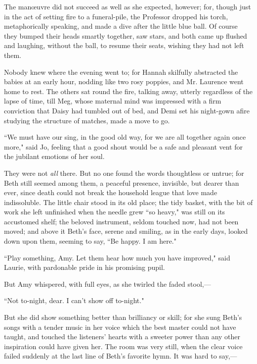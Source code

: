 The manœuvre did not succeed as well as she expected, however; for,
though just in the act of setting fire to a funeral-pile, the Professor
dropped his torch, metaphorically speaking, and made a dive after the
little blue ball. Of course they bumped their heads smartly together,
saw stars, and both came up flushed and laughing, without the ball, to
resume their seats, wishing they had not left them.

Nobody knew where the evening went to; for Hannah skilfully abstracted
the babies at an early hour, nodding like two rosy poppies, and Mr.
Laurence went home to rest. The others sat round the fire, talking away,
utterly regardless of the lapse of time, till Meg, whose maternal mind
was impressed with a firm conviction that Daisy had tumbled out of bed,
and Demi set his night-gown afire studying the structure of matches,
made a move to go.

``We must have our sing, in the good old way, for we are all together
again once more," said Jo, feeling that a good shout would be a safe and
pleasant vent for the jubilant emotions of her soul.

They were not \emph{all} there. But no one found the words thoughtless
or untrue; for Beth still seemed among them, a peaceful presence,
invisible, but dearer than ever, since death could not break the
household league that love made indissoluble. The little chair stood in
its old place; the tidy basket, with the bit of work she left unfinished
when the needle grew ``so heavy," was still on its accustomed shelf; the
beloved instrument, seldom touched now, had not been moved; and above it
Beth's face, serene and smiling, as in the early days,
looked down upon them, seeming to say, ``Be happy. I am here."

``Play something, Amy. Let them hear how much you have improved," said
Laurie, with pardonable pride in his promising pupil.

But Amy whispered, with full eyes, as she twirled the faded stool,---

``Not to-night, dear. I can't show off to-night."

But she did show something better than brilliancy or skill; for she sung
Beth's songs with a tender music in her voice which the
best master could not have taught, and touched the
listeners' hearts with a sweeter power than any other
inspiration could have given her. The room was very still, when the
clear voice failed suddenly at the last line of Beth's
favorite hymn. It was hard to say,---

